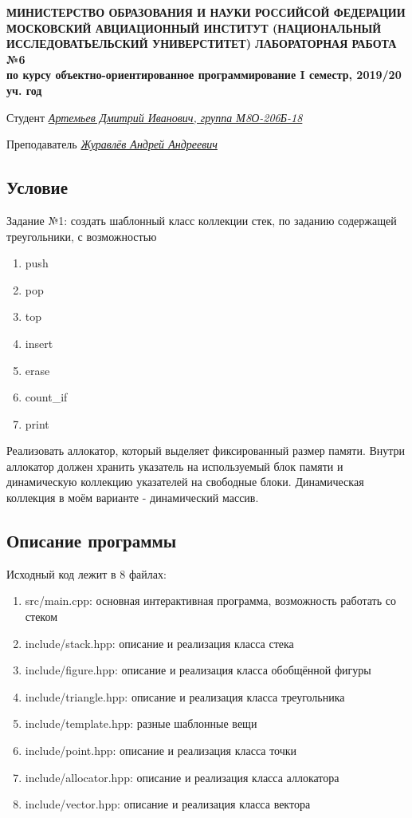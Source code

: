 \documentclass[12pt]{article}
\begin{document}
\begin{titlepage}
\begin{center}
\textbf{МИНИСТЕРСТВО ОБРАЗОВАНИЯ И НАУКИ РОССИЙСОЙ ФЕДЕРАЦИИ
\medskip
МОСКОВСКИЙ АВЦИАЦИОННЫЙ ИНСТИТУТ
(НАЦИОНАЛЬНЫЙ ИССЛЕДОВАТЬЕЛЬСКИЙ УНИВЕРСТИТЕТ)
\vfill\vfill
{\Huge ЛАБОРАТОРНАЯ РАБОТА №6} \\
по курсу объектно-ориентированное программирование
I семестр, 2019/20 уч. год}
\end{center}
\vfill

Студент \uline{\it {Артемьев Дмитрий Иванович, группа М8О-206Б-18}\hfill}

Преподаватель \uline{\it {Журавлёв Андрей Андреевич}\hfill}

\vfill
\end{titlepage}

\subsection*{Условие}

Задание №1: создать шаблонный класс коллекции стек, по заданию содержащей треугольники, с возможностью
\begin{enumerate}
\item push 
\item pop 
\item top 
\item insert 
\item erase 
\item count\_if
\item print
\end{enumerate}

Реализовать аллокатор, который выделяет фиксированный размер памяти. Внутри аллокатор должен хранить указатель на используемый блок памяти и динамическую коллекцию указателей на свободные блоки. Динамическая коллекция в моём варианте - динамический массив. 

\subsection*{Описание программы}

Исходный код лежит в 8 файлах:
\begin{enumerate}
\item src/main.cpp: основная интерактивная программа, возможность работать со стеком
\item include/stack.hpp: описание и реализация класса стека
\item include/figure.hpp: описание и реализация класса обобщённой фигуры
\item include/triangle.hpp: описание и реализация класса треугольника
\item include/template.hpp: разные шаблонные вещи
\item include/point.hpp: описание и реализация класса точки
\item include/allocator.hpp: описание и реализация класса аллокатора
\item include/vector.hpp: описание и реализация класса вектора
  
\end{enumerate}
\end{document}
